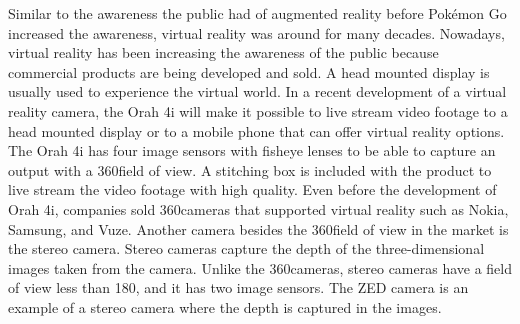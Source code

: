 Similar to the awareness the public had of augmented reality before Pok\'{e}mon Go increased the awareness, virtual reality was around for many decades. Nowadays, virtual reality has been increasing the awareness of the public because commercial products are being developed and sold. A head mounted display is usually used to experience the virtual world. In a recent development of a virtual reality camera, the Orah 4i will make it possible to live stream video footage to a head mounted display or to a mobile phone that can offer virtual reality options. The Orah 4i has four image sensors with fisheye lenses to be able to capture an output with a 360\textdegree field of view. A stitching box is included with the product to live stream the video footage with high quality. Even before the development of Orah 4i, companies sold 360\textdegree cameras that supported virtual reality such as Nokia, Samsung, and Vuze. Another camera besides the 360\textdegree field of view in the market is the stereo camera. Stereo cameras capture the depth of the three-dimensional images taken from the camera. Unlike the 360\textdegree cameras, stereo cameras have a field of view less than 180\textdegree, and it has two image sensors. The ZED camera is an example of a stereo camera where the depth is captured in the images.